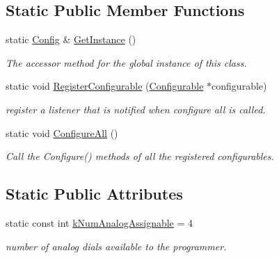 \subsection*{\-Static \-Public \-Member \-Functions}
\begin{DoxyCompactItemize}
\item 
\hypertarget{class_config_a8d16346252818f578e1232bab86cdaef}{static \hyperlink{class_config}{\-Config} \& \hyperlink{class_config_a8d16346252818f578e1232bab86cdaef}{\-Get\-Instance} ()}\label{class_config_a8d16346252818f578e1232bab86cdaef}

\begin{DoxyCompactList}\small\item\em \-The accessor method for the global instance of this class. \end{DoxyCompactList}\item 
\hypertarget{class_config_ac9bb425d0132c84317e9e3528dbf97fb}{static void \hyperlink{class_config_ac9bb425d0132c84317e9e3528dbf97fb}{\-Register\-Configurable} (\hyperlink{class_configurable}{\-Configurable} $\ast$configurable)}\label{class_config_ac9bb425d0132c84317e9e3528dbf97fb}

\begin{DoxyCompactList}\small\item\em register a listener that is notified when configure all is called. \end{DoxyCompactList}\item 
\hypertarget{class_config_a93caf01e5a4e8adaef68802ce13161be}{static void \hyperlink{class_config_a93caf01e5a4e8adaef68802ce13161be}{\-Configure\-All} ()}\label{class_config_a93caf01e5a4e8adaef68802ce13161be}

\begin{DoxyCompactList}\small\item\em \-Call the \-Configure() methods of all the registered configurables. \end{DoxyCompactList}\end{DoxyCompactItemize}
\subsection*{\-Static \-Public \-Attributes}
\begin{DoxyCompactItemize}
\item 
\hypertarget{class_config_a1b3d97e9d23cfbd209a171302eb8bc82}{static const int \hyperlink{class_config_a1b3d97e9d23cfbd209a171302eb8bc82}{k\-Num\-Analog\-Assignable} = 4}\label{class_config_a1b3d97e9d23cfbd209a171302eb8bc82}

\begin{DoxyCompactList}\small\item\em number of analog dials available to the programmer. \end{DoxyCompactList}\end{DoxyCompactItemize}



